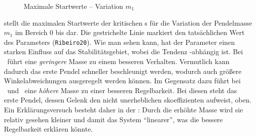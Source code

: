 \begin{figure}
	\caption{Maximale Startwerte -- Variation $m_1$}
	\label{fig:sysvarm1}
\end{figure}

 stellt die maximalen Startwerte der kritischen \xots s für die Variation der Pendelmasse $m_1$ im Bereich $0$ bis  dar.
Die gestrichelte Linie markiert den tatsächlichen Wert des Parameters (\texttt{Ribeiro20}).
Wie man sehen kann, hat der Parameter einen starken Einfluss auf das Stabilitätsgebiet, wobei die Tendenz \ap-abhängig ist.
Bei \apz\ führt eine \emph{geringere} Masse zu einem besseren Verhalten.
Vermutlich kann dadurch das erste Pendel schneller beschleunigt werden, wodurch auch größere Winkelabweichungen ausgeregelt werden können.
Im Gegensatz dazu führt bei \apd\ und \apv\ eine \emph{höhere} Masse zu einer besseren Regelbarkeit.
Bei diesen steht das erste Pendel, dessen Gelenk den nicht unerheblichen \crb skoeffizienten aufweist, oben.
Ein Erklärungsversuch besteht daher in der \crb: Durch die erhöhte Masse wird sie relativ gesehen kleiner und damit das System "`linearer"', was die bessere Regelbarkeit erklären könnte.

